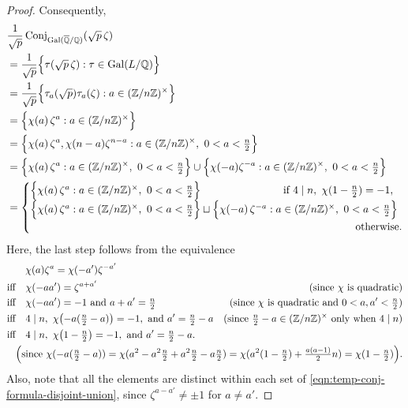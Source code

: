 \documentclass[11pt,letterpaper,reqno]{amsart}
\theoremstyle{definition}
\numberwithin{equation}{section}
\numberwithin{figure}{section}
\numberwithin{table}{section}
\newcommand{\lrp}[1]{\!\left(#1\right)}
\newcommand{\ZZ}{\mathbb{Z}}
\newcommand{\QQ}{\mathbb{Q}}
\begin{document}
\begin{proof}
Consequently,
\begin{align}
    &\frac{1}{\sqrt p} \operatorname{Conj}_{\operatorname{Gal}(\overline{\QQ}/\QQ)}(\sqrt p\,\zeta) \\
    &=
    \frac{1}{\sqrt p} \Big\{\tau(\sqrt p\,\zeta):\tau\in\operatorname{Gal}(L/\QQ)\Big\} \\
    &=
    \frac{1}{\sqrt p} \Big\{\tau_a(\sqrt p) \tau_a(\zeta) : a \in (\ZZ/n\ZZ)^{\times}\Big\} \\
    &=
    \Big\{\chi(a)\,\zeta^a : a \in (\ZZ/n\ZZ)^{\times}\Big\} \\
    &=
    \Big\{\chi(a)\,\zeta^a, \chi(n-a) \zeta^{n-a} : a \in (\ZZ/n\ZZ)^{\times},\ 0 < a < \tfrac{n}{2} \Big\} \\
    &=
    \Big\{\chi(a)\,\zeta^a : a \in (\ZZ/n\ZZ)^{\times},\ 0 < a < \tfrac{n}{2} \Big\} 
    \cup 
    \Big\{\chi(-a) \zeta^{-a} : a \in (\ZZ/n\ZZ)^{\times},\ 0 < a < \tfrac{n}{2} \Big\}
    \\ 
    &= 
    \begin{cases}
        \Big\{\chi(a)\,\zeta^a : a \in (\ZZ/n\ZZ)^{\times},\ 0 < a < \tfrac{n}{2} \Big\}
        &\hspace{-45mm}
        \quad\text{if } 4\mid n,\ \chi(1-\tfrac{n}{2})=-1,  \\
        \Big\{\chi(a)\,\zeta^a : a \in (\ZZ/n\ZZ)^{\times},\ 0 < a < \tfrac{n}{2} \Big\} 
        \sqcup
        \Big\{\chi(-a)\,\zeta^{-a} : a \in (\ZZ/n\ZZ)^{\times},\ 0 < a < \tfrac{n}{2} \Big\}
        \label{eqn:temp-conj-formula-disjoint-union}
        \\
        &\hspace{-17.5mm} \text{otherwise.}  
    \end{cases}  
\end{align}
Here, the last step follows from the equivalence
\begin{align} \label{eqn:temp-twisted-roots-of-unity-overlap-equiv-condition}
    &\quad\ \ \,  \chi(a) \zeta^a = \chi(-a') \zeta^{-a'}  \\
    &\text{iff}\quad
    \chi(-aa') =\zeta^{a+a'}  
    & \text{(since $\chi$ is quadratic)} \\
    &\text{iff}\quad
    \chi(-aa') = -1
    \text{ and }
    a+a' = \tfrac{n}{2} 
    &\text{(since $\chi$ is quadratic and $0 < a,a' < \tfrac{n}{2}$)}
    \\
    &\text{iff}\quad
    4 \mid n,\ \chi\lrp{-a(\tfrac{n}{2} - a)}=-1, \text{ and } 
    a' = \tfrac{n}{2}-a 
    &\text{(since $\tfrac{n}{2} - a \in (\ZZ/n\ZZ)^\times$ only when $4 \mid n$)} 
    \\
    &\text{iff}\quad
    4 \mid n,\ \chi\lrp{1-\tfrac{n}{2}}=-1, \text{ and } 
    a' = \tfrac{n}{2}-a. \\
    & &
    \hspace{-80mm}
    \Big(\text{since $\chi(-a(\tfrac{n}{2}-a)) = \chi(a^2 - a^2 \tfrac{n}{2} + a^2 \tfrac{n}{2} - a \tfrac{n}{2}) = \chi(a^2 (1-\tfrac{n}{2}) + \tfrac{a(a-1)}{2}n) = \chi(1 - \tfrac{n}{2})$}\Big). 
\end{align}
Also, note that all the elements are distinct within each set of \eqref{eqn:temp-conj-formula-disjoint-union}, since $\zeta^{a-a'} \ne \pm 1$ for $a \ne a'$. 


\end{proof}
\end{document}
